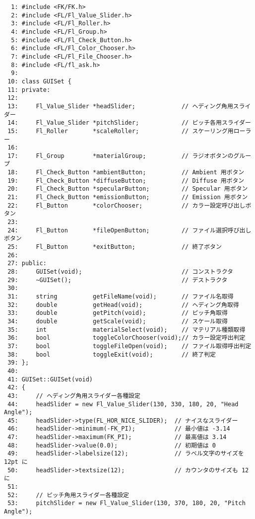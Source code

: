\begin{breakbox}
\begin{verbatim}
  1: #include <FK/FK.h>
  2: #include <FL/Fl_Value_Slider.h>
  3: #include <FL/Fl_Roller.h>
  4: #include <FL/Fl_Group.h>
  5: #include <FL/Fl_Check_Button.h>
  6: #include <FL/Fl_Color_Chooser.h>
  7: #include <FL/Fl_File_Chooser.h>
  8: #include <FL/fl_ask.h>
  9: 
 10: class GUISet {
 11: private:
 12: 
 13:     Fl_Value_Slider *headSlider;             // ヘディング角用スライダー
 14:     Fl_Value_Slider *pitchSlider;            // ピッチ各用スライダー
 15:     Fl_Roller       *scaleRoller;            // スケーリング用ローラー
 16: 
 17:     Fl_Group        *materialGroup;          // ラジオボタンのグループ
 18:     Fl_Check_Button *ambientButton;          // Ambient 用ボタン
 19:     Fl_Check_Button *diffuseButton;          // Diffuse 用ボタン
 20:     Fl_Check_Button *specularButton;         // Specular 用ボタン
 21:     Fl_Check_Button *emissionButton;         // Emission 用ボタン
 22:     Fl_Button       *colorChooser;           // カラー設定呼び出しボタン
 23: 
 24:     Fl_Button       *fileOpenButton;         // ファイル選択呼び出しボタン
 25:     Fl_Button       *exitButton;             // 終了ボタン
 26: 
 27: public:
 28:     GUISet(void);                            // コンストラクタ
 29:     ~GUISet();                               // デストラクタ
 30: 
 31:     string          getFileName(void);       // ファイル名取得
 32:     double          getHead(void);           // ヘディング角取得
 33:     double          getPitch(void);          // ピッチ角取得
 34:     double          getScale(void);          // スケール取得
 35:     int             materialSelect(void);    // マテリアル種類取得
 36:     bool            toggleColorChooser(void);// カラー設定呼出判定
 37:     bool            toggleFileOpen(void);    // ファイル取得呼出判定
 38:     bool            toggleExit(void);        // 終了判定
 39: };
 40: 
 41: GUISet::GUISet(void)
 42: {
 43:     // ヘディング角用スライダー各種設定
 44:     headSlider = new Fl_Value_Slider(130, 330, 180, 20, "Head Angle");
 45:     headSlider->type(FL_HOR_NICE_SLIDER);  // ナイスなスライダー
 46:     headSlider->minimum(-FK_PI);           // 最小値は -3.14
 47:     headSlider->maximum(FK_PI);            // 最高値は 3.14
 48:     headSlider->value(0.0);                // 初期値は 0
 49:     headSlider->labelsize(12);             // ラベル文字のサイズを 12pt に
 50:     headSlider->textsize(12);              // カウンタのサイズも 12 に
 51: 
 52:     // ピッチ角用スライダー各種設定
 53:     pitchSlider = new Fl_Value_Slider(130, 370, 180, 20, "Pitch Angle");

\end{verbatim}
\end{breakbox}
